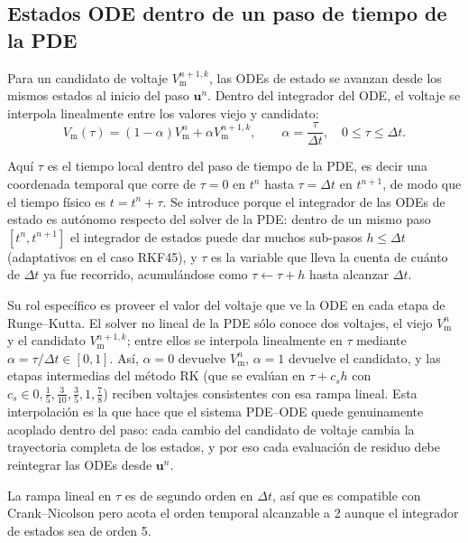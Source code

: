 \documentclass[11pt,a4paper]{article}
\newcommand{\Vm}{V_{\text{m}}}
\begin{document}
\subsection{Estados ODE dentro de un paso de tiempo de la PDE}

Para un candidato de voltaje $\Vm^{n+1,k}$, las ODEs de estado se avanzan desde los mismos
estados al inicio del paso $\mathbf{u}^n$. Dentro del integrador del ODE, el voltaje se
interpola linealmente entre los valores viejo y candidato:
\begin{equation}
  \Vm(\tau)
  =
  (1-\alpha)\Vm^n+\alpha \Vm^{n+1,k},
  \qquad
  \alpha=\frac{\tau}{\Delta t},\quad 0\le \tau\le \Delta t.
  \label{eq:ode-vm-interpolation}
\end{equation}

Aquí $\tau$ es el tiempo local dentro del paso de tiempo de la PDE, es decir una coordenada temporal que corre de $\tau=0$ en $t^n$ hasta $\tau=\Delta t$ en $t^{n+1}$, de modo que el tiempo físico es $t=t^n+\tau$. Se introduce porque el integrador de las ODEs de estado es autónomo respecto del solver de la PDE: dentro de un mismo paso $[t^n,t^{n+1}]$ el integrador de estados puede dar muchos sub-pasos $h\le\Delta t$ (adaptativos en el caso RKF45), y $\tau$ es la variable que lleva la cuenta de cuánto de $\Delta t$ ya fue recorrido, acumulándose como $\tau\leftarrow\tau+h$ hasta alcanzar $\Delta t$.

Su rol específico es proveer el valor del voltaje que ve la ODE en cada etapa de Runge–Kutta. El solver no lineal de la PDE sólo conoce dos voltajes, el viejo $\Vm^n$ y el candidato $\Vm^{n+1,k}$; entre ellos se interpola linealmente en $\tau$ mediante $\alpha=\tau/\Delta t\in[0,1]$. Así, $\alpha=0$ devuelve $\Vm^n$, $\alpha=1$ devuelve el candidato, y las etapas intermedias del método RK (que se evalúan en $\tau+c_s h$ con $c_s\in{0,\tfrac15,\tfrac3{10},\tfrac35,1,\tfrac78}$) reciben voltajes consistentes con esa rampa lineal. Esta interpolación es la que hace que el sistema PDE–ODE quede genuinamente acoplado dentro del paso: cada cambio del candidato de voltaje cambia la trayectoria completa de los estados, y por eso cada evaluación de residuo debe reintegrar las ODEs desde $\mathbf{u}^n$.

La rampa lineal en $\tau$ es de segundo orden en $\Delta t$, así que es compatible con Crank–Nicolson pero acota el orden temporal alcanzable a 2 aunque el integrador de estados sea de orden 5.
\end{document}

